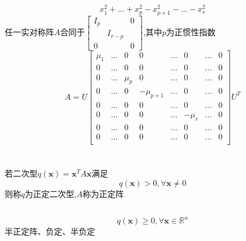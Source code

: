 \documentclass[11pt, a4paper, UTF8]{ctexart}
\begin{document}
\subsection{}
\subsection{}
\[x_1^2+...+x_p^2-x_{p+1}^2-...-x_r^2\]
任一实对称阵$A$合同于$\begin{bmatrix}
I_p&&0\\
&I_{r-p}&\\
0&&0
\end{bmatrix}$,其中$p$为正惯性指数
\[A=U\begin{bmatrix}
\mu_1&...&0&0&...&0&...&0\\
0&...&0&0&...&0&...&0\\
0&...&\mu_p&0&...&0&...&0\\
0&...&0&-\mu_{p+1}&...&0&...&0\\
0&...&0&0&...&0&...&0\\
0&...&0&0&...&-\mu_r&...&0\\
0&...&0&0&...&0&...&0\\
0&...&0&0&...&0&...&0\\
\end{bmatrix}U^T\]
\section{}
若二次型$q(\bm x)=\bm x^TA\bm x$满足
\[q(\bm x)>0,\forall\bm x\not=0\]
则称$q$为正定二次型,$A$称为正定阵
\subsection{}
\[q(\bm x)\ge0,\forall\bm x\in\mathbb{R}^n\]
半正定阵、负定、半负定
\subsection{}
\subsection{}
\subsection{}
\end{document}
